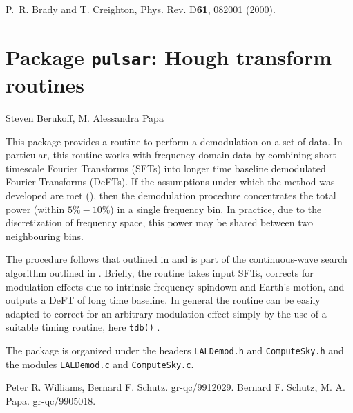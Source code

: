 \newpage\begin{thebibliography}{0}
  P.~R. Brady and T. Creighton, Phys. Rev. D\textbf{61}, 082001
  (2000).
\end{thebibliography}

\chapter{Package \texttt{pulsar}: Hough transform routines}
Steven Berukoff, M. Alessandra Papa
\bigskip


This package provides a routine to perform a demodulation on a set of data.
In particular, this routine works with frequency domain data by combining
short timescale Fourier Transforms (SFTs) into longer time baseline
demodulated Fourier Transforms (DeFTs). If the assumptions under which the
method was developed are met (\cite{Williams:1999}), then the demodulation
procedure concentrates the total power (within $5\%-10\%$) in a single
frequency bin. In practice, due to the discretization of frequency space, this
power may be shared between two neighbouring bins.

The procedure follows that outlined in \cite{Williams:1999} and is part of the
continuous-wave search algorithm outlined in \cite{Schutz:1999}.  Briefly, the
routine takes input SFTs, corrects for modulation effects due to intrinsic
frequency spindown and Earth's motion, and outputs a DeFT of long time
baseline. In general the routine can be easily adapted to correct for an
arbitrary modulation effect simply by the use of a suitable timing routine,
here \verb+tdb()+ .

The package is organized under the headers \verb+LALDemod.h+ and
\verb+ComputeSky.h+ and the modules \verb+LALDemod.c+ and \verb+ComputeSky.c+.


\newpage
\newpage

\newpage\begin{thebibliography}{0}
	Peter R. Williams, Bernard F. Schutz.  gr-qc/9912029.
	Bernard F. Schutz, M. A. Papa.  gr-qc/9905018. 
\end{thebibliography}
